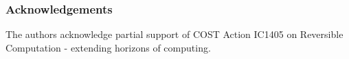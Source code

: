 \documentclass[preprint,12pt]{elsarticle}
\begin{document}
\subsubsection*{Acknowledgements}
The authors acknowledge partial support of COST Action IC1405 on Reversible Computation -
extending horizons of computing.













\end{document}
